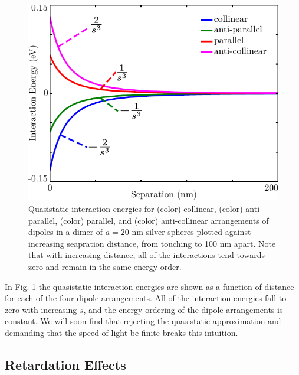 \documentclass [11pt, proquest] {uwthesis}[2016/11/22]
\begin{document}
\begin{figure}
\begin{centering}
\includegraphics{dimer_stat.pdf}
\caption{Quasistatic interaction energies for (color) collinear, (color) anti-parallel, (color) parallel, and (color) anti-collinear arrangements of dipoles in a dimer of $a=20$ nm silver spheres plotted against increasing seapration distance, from touching to 100 nm apart. Note that with increasing distance, all of the interactions tend towards zero and remain in the same energy-order.}
\label{dimer_stat}
\end{centering}
\end{figure}

In Fig. \ref{dimer_stat} the quasistatic interaction energies are shown as a function of distance for each of the four dipole arrangements. All of the interaction energies fall to zero with increasing $s$, and the energy-ordering of the dipole arrangements is constant. We will soon find that rejecting the quasistatic approximation and demanding that the speed of light be finite breaks this intuition.

\subsection{Retardation Effects}
\end{document}
